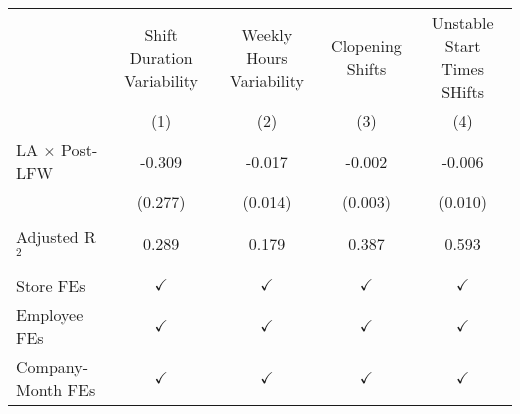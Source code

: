 
\begingroup
\centering
\scriptsize
\begin{tabular}{lcccc}
   \toprule
                         & Shift Duration Variability & Weekly Hours Variability & Clopening Shifts    &  Unstable Start Times SHifts\\   
                         & (1)            & (2)             & (3)           & (4)\\  
   \midrule 
   LA $\times$ Post-LFW  & -0.309         & -0.017          & -0.002        & -0.006\\   
                         & (0.277)        & (0.014)         & (0.003)       & (0.010)\\   
    \\
   Adjusted R$^2$        & 0.289          & 0.179           & 0.387         & 0.593\\  
    \\
   Store FEs             & $\checkmark$   & $\checkmark$    & $\checkmark$  & $\checkmark$\\   
   Employee FEs          & $\checkmark$   & $\checkmark$    & $\checkmark$  & $\checkmark$\\   
   Company-Month FEs     & $\checkmark$   & $\checkmark$    & $\checkmark$  & $\checkmark$\\   
   \bottomrule
\end{tabular}
\par\endgroup


